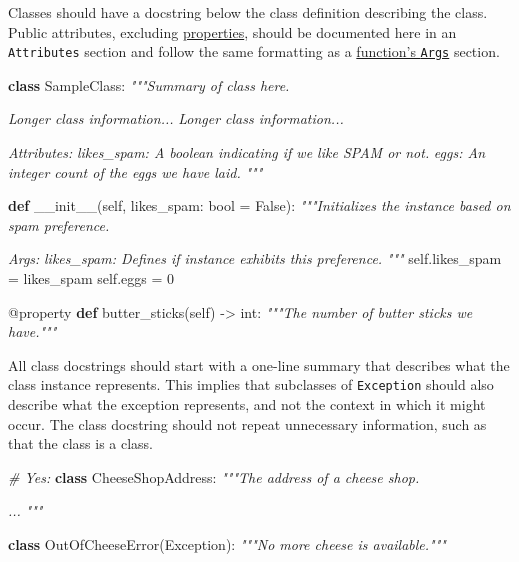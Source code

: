 \documentclass[
]{article}
\newenvironment{Shaded}{}{}
\newcommand{\AttributeTok}[1]{\textcolor[rgb]{0.49,0.56,0.16}{#1}}
\newcommand{\BuiltInTok}[1]{\textcolor[rgb]{0.00,0.50,0.00}{#1}}
\newcommand{\CommentTok}[1]{\textcolor[rgb]{0.38,0.63,0.69}{\textit{#1}}}
\newcommand{\DecValTok}[1]{\textcolor[rgb]{0.25,0.63,0.44}{#1}}
\newcommand{\FunctionTok}[1]{\textcolor[rgb]{0.02,0.16,0.49}{#1}}
\newcommand{\KeywordTok}[1]{\textcolor[rgb]{0.00,0.44,0.13}{\textbf{#1}}}
\newcommand{\NormalTok}[1]{#1}
\newcommand{\OperatorTok}[1]{\textcolor[rgb]{0.40,0.40,0.40}{#1}}
\newcommand{\PreprocessorTok}[1]{\textcolor[rgb]{0.74,0.48,0.00}{#1}}
\newcommand{\VariableTok}[1]{\textcolor[rgb]{0.10,0.09,0.49}{#1}}
\begin{document}
Classes should have a docstring below the class definition describing
the class. Public attributes, excluding
\hyperref[properties]{properties}, should be documented here in an
\texttt{Attributes} section and follow the same formatting as a
\hyperref[doc-function-args]{function's \texttt{Args}} section.

\begin{samepage}
\begin{Shaded}
\begin{Highlighting}[]
\KeywordTok{class}\NormalTok{ SampleClass:}
    \CommentTok{"""Summary of class here.}

\CommentTok{    Longer class information...}
\CommentTok{    Longer class information...}

\CommentTok{    Attributes:}
\CommentTok{        likes\_spam: A boolean indicating if we like SPAM or not.}
\CommentTok{        eggs: An integer count of the eggs we have laid.}
\CommentTok{    """}

    \KeywordTok{def} \FunctionTok{\_\_init\_\_}\NormalTok{(}\VariableTok{self}\NormalTok{, likes\_spam: }\BuiltInTok{bool} \OperatorTok{=} \VariableTok{False}\NormalTok{):}
        \CommentTok{"""Initializes the instance based on spam preference.}

\CommentTok{        Args:}
\CommentTok{          likes\_spam: Defines if instance exhibits this preference.}
\CommentTok{        """}
        \VariableTok{self}\NormalTok{.likes\_spam }\OperatorTok{=}\NormalTok{ likes\_spam}
        \VariableTok{self}\NormalTok{.eggs }\OperatorTok{=} \DecValTok{0}

    \AttributeTok{@property}
    \KeywordTok{def}\NormalTok{ butter\_sticks(}\VariableTok{self}\NormalTok{) }\OperatorTok{{-}\textgreater{}} \BuiltInTok{int}\NormalTok{:}
        \CommentTok{"""The number of butter sticks we have."""}
\end{Highlighting}
\end{Shaded}
\end{samepage}

All class docstrings should start with a one-line summary that describes
what the class instance represents. This implies that subclasses of
\texttt{Exception} should also describe what the exception represents,
and not the context in which it might occur. The class docstring should
not repeat unnecessary information, such as that the class is a class.

\begin{samepage}
\begin{Shaded}
\begin{Highlighting}[]
\CommentTok{\# Yes:}
\KeywordTok{class}\NormalTok{ CheeseShopAddress:}
  \CommentTok{"""The address of a cheese shop.}

\CommentTok{  ...}
\CommentTok{  """}

\KeywordTok{class}\NormalTok{ OutOfCheeseError(}\PreprocessorTok{Exception}\NormalTok{):}
  \CommentTok{"""No more cheese is available."""}
\end{Highlighting}
\end{Shaded}
\end{samepage}
\end{document}
